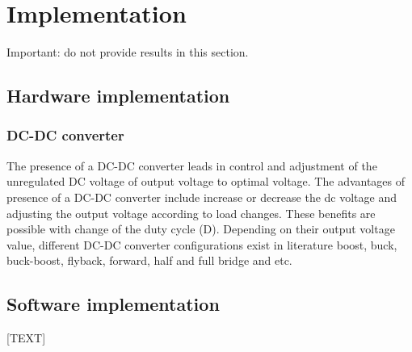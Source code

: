 \chapter{Implementation}


Important: do not provide results in this section.

\section{Hardware implementation}

\subsection{DC-DC converter}
The presence of a DC-DC converter leads in control and adjustment of the unregulated DC voltage of output voltage to optimal voltage. The advantages of presence of a DC-DC converter include increase or decrease the dc voltage and adjusting the output voltage according to load changes. These benefits are possible with change of the duty cycle (D). Depending on their output voltage value, different DC-DC converter configurations exist in literature boost, buck, buck-boost, flyback, forward, half and full bridge and etc.


\section{Software implementation}

[TEXT]
